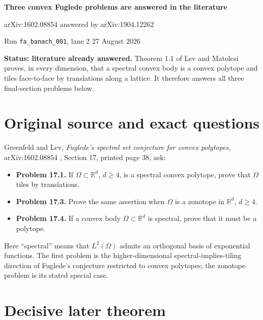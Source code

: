 \documentclass[11pt]{article}
\begin{document}
\begin{center}
{\LARGE\bfseries Three convex Fuglede problems are answered in the literature\par}
\vspace{0.45em}
{\large arXiv:1602.08854 answered by arXiv:1904.12262\par}
\vspace{0.45em}
{\normalsize Run \texttt{fa\_banach\_001}, lane 2 \hfill 27 August 2026}
\end{center}

\vspace{0.6em}
\noindent\colorbox{statusbg}{%
\begin{minipage}{0.94\linewidth}
\textbf{Status: literature already answered.}
Theorem 1.1 of Lev and Matolcsi proves, in every dimension, that a spectral
convex body is a convex polytope and tiles face-to-face by translations along
a lattice. It therefore answers all three final-section problems below.
\end{minipage}}

\section*{Original source and exact questions}

Greenfeld and Lev, \emph{Fuglede's spectral set conjecture for convex
polytopes}, arXiv:1602.08854 \cite{GL}, Section 17, printed page 38, ask:

\begin{itemize}
\item \textbf{Problem 17.1.} If $\Omega\subset\mathbb{R}^d$, $d\geq 4$, is a
spectral convex polytope, prove that $\Omega$ tiles by translations.
\item \textbf{Problem 17.3.} Prove the same assertion when $\Omega$ is a
zonotope in $\mathbb{R}^d$, $d\geq 4$.
\item \textbf{Problem 17.4.} If a convex body $\Omega\subset\mathbb{R}^d$ is
spectral, prove that it must be a polytope.
\end{itemize}

Here ``spectral'' means that $L^2(\Omega)$ admits an orthogonal basis of
exponential functions. The first problem is the higher-dimensional
spectral-implies-tiling direction of Fuglede's conjecture restricted to convex
polytopes; the zonotope problem is its stated special case.

\section*{Decisive later theorem}
\end{document}

